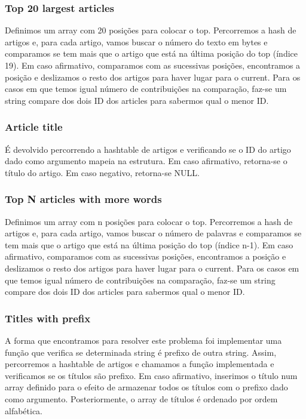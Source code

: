 \documentclass[a4paper]{article}
\begin{document}
\subsubsection{Top 20 largest articles}
Definimos um array com 20 posições para colocar o top. Percorremos a hash de artigos e, para cada artigo, vamos buscar o número do texto em bytes e comparamos se tem mais que o artigo que está na última posição do top (índice 19). Em caso afirmativo, comparamos com as sucessivas posições, encontramos a posição e deslizamos o resto dos artigos para haver lugar para o current. Para os casos em que temos igual número de contribuições na comparação, faz-se um string compare dos dois ID dos articles para sabermos qual o menor ID.

\subsubsection{Article title}
É devolvido percorrendo a hashtable de artigos e verificando se o ID do artigo dado como argumento mapeia na estrutura. Em caso afirmativo, retorna-se o título do artigo. Em caso negativo, retorna-se NULL.

\subsubsection{Top N articles with more words}
Definimos um array com n posições para colocar o top. Percorremos a hash de artigos e, para cada artigo, vamos buscar o número de palavras e comparamos se tem mais que o artigo que está na última posição do top (índice n-1). Em caso afirmativo, comparamos com as sucessivas posições, encontramos a posição e deslizamos o resto dos artigos para haver lugar para o current. Para os casos em que temos igual número de contribuições na comparação, faz-se um string compare dos dois ID dos articles para sabermos qual o menor ID.

\subsubsection{Titles with prefix}
A forma que encontramos para resolver este problema foi implementar uma função que verifica se determinada string é prefixo de outra string. Assim, percorremos a hashtable de artigos e chamamos a função implementada e verificamos se os títulos são prefixo. Em caso afirmativo, inserimos o título num array definido para o efeito de armazenar todos os títulos com o prefixo dado como argumento. Posteriormente, o array de títulos é ordenado por ordem alfabética.
\end{document}
